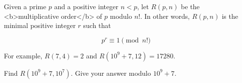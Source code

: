 Given a prime $p$ and a positive integer $n \lt p$, let $R(p, n)$ be the <b>multiplicative order</b> of $p$ modulo $n!$.
In other words, $R(p, n)$ is the minimal positive integer $r$ such that

$$p^r \equiv 1 \pmod{n!}$$

For example, $R(7, 4) = 2$ and $R(10^9 + 7, 12) = 17280$.

Find $R(10^9 + 7, 10^7)$. Give your answer modulo $10^9 + 7$.

